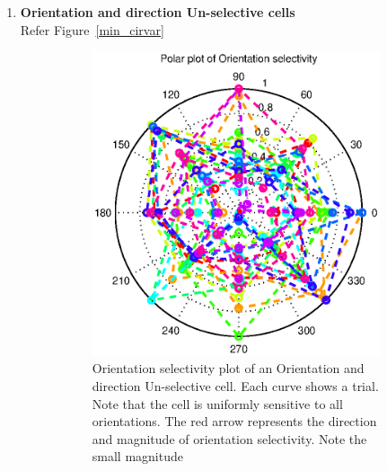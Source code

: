 \documentclass[11pt]{article}
\newcommand{\rulesep}{\unskip\ \vrule\ }
\begin{document}
\begin{enumerate}
\begin{figure}
\begin{subfigure}{.48\textwidth}
            \caption{Directional selectivity plot of an direction selective complex cell. Each curve shows a trial. Note that the cell is selective to direction as well as orientation. The red arrow represents the direction and magnitude of direction selectivity}
        \end{subfigure}        
    \end{figure}
    \item \textbf{Orientation and direction Un-selective cells}\\
    Refer Figure~\ref{min_cirvar}
    \begin{figure}
        \centering
        \caption{Orientation and direction Un-selective cells}
        \label{min_cirvar}
        \begin{subfigure}{.48\textwidth}
            \centering
        \includegraphics[width=\linewidth]{plots/min_cirvar_ori}
            \caption{Orientation selectivity plot of an Orientation and direction Un-selective cell. Each curve shows a trial. Note that the cell is uniformly sensitive to all orientations. The red arrow represents the direction and magnitude of orientation selectivity. Note the small magnitude}
        \end{subfigure}
        \rulesep
        \begin{subfigure}{.48\textwidth}

\end{subfigure}
\end{figure}
\end{enumerate}
\end{document}
